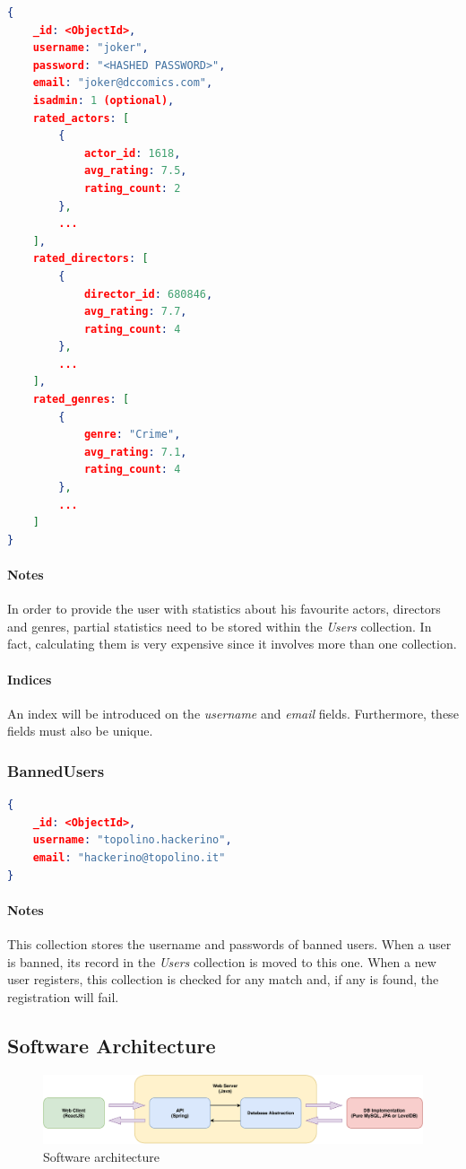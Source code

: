 \documentclass[11pt]{article}
\begin{document}
\begin{lstlisting}[language=json]	
{
	_id: <ObjectId>,
	username: "joker",
	password: "<HASHED PASSWORD>",
	email: "joker@dccomics.com",
	isadmin: 1 (optional),
	rated_actors: [
		{
			actor_id: 1618,
			avg_rating: 7.5,
			rating_count: 2
		},
		...
	],
	rated_directors: [
		{
			director_id: 680846,
			avg_rating: 7.7,
			rating_count: 4
		},
		...
	],
	rated_genres: [
		{
			genre: "Crime",
			avg_rating: 7.1,
			rating_count: 4
		},
		...
	]
}
\end{lstlisting}

\paragraph{Notes}
In order to provide the user with statistics about his favourite actors, directors
and genres, partial statistics need to be stored within the \emph{Users} collection. 
In fact, calculating them is very expensive since it involves 
more than one collection.

\paragraph{Indices} 
An index will be introduced on the \emph{username} and \emph{email} fields. 
Furthermore, these fields must also be unique.

\subsubsection{BannedUsers}
\label{sec:banned_users}

\begin{lstlisting}[language=json]	
{
	_id: <ObjectId>,
	username: "topolino.hackerino",
	email: "hackerino@topolino.it"
}
\end{lstlisting}

\paragraph{Notes}
This collection stores the username and passwords of banned users. 
When a user is banned, its record in the \emph{Users} collection is moved
to this one.
When a new user registers, this collection is checked for any match and, 
if any is found, the registration will fail. 


\subsection{Software Architecture}
\begin{figure}[h!]
	\centering
	\includegraphics[width=\textwidth]{figs/system_architecture}
	\caption{Software architecture}
	\label{fig:software_architecture}
\end{figure}
\end{document}
